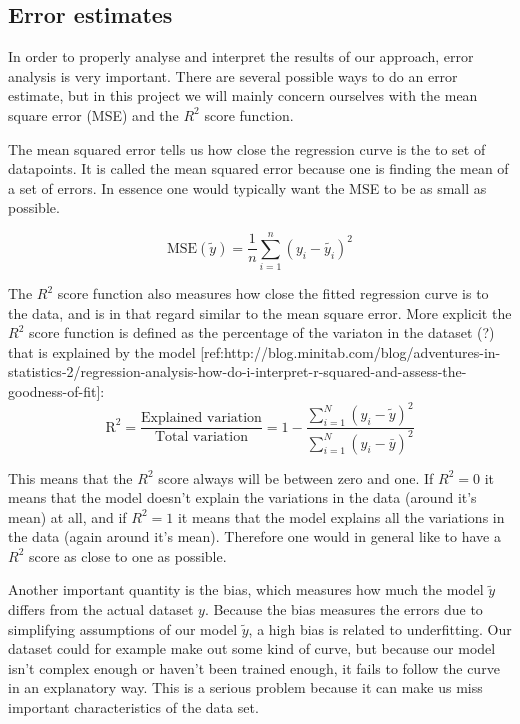 \documentclass[a4paper,12pt]{article}
\begin{document}
\subsection{Error estimates}
In order to properly analyse and interpret the results of our approach, error analysis is very important. There are several possible ways to do an error estimate, but in this project we will mainly concern ourselves with the mean square error (MSE) and the $R^2$ score function.\newline

The mean squared error tells us how close the regression curve is the to set of datapoints. It is called the mean squared error because one is finding the mean of a set of errors. In essence one would typically want the MSE to be as small as possible.

\begin{equation}
\text{MSE}(\tilde{y})=\frac{1}{n}\sum_{i=1}^n(y_i-\tilde{y_i})^2
\end{equation}

The $R^2$ score function also measures how close the fitted regression curve is to the data, and is in that regard similar to the mean square error. More explicit the $R^2$ score function is defined as the percentage of the variaton in the dataset (?) that is explained by the model [ref:http://blog.minitab.com/blog/adventures-in-statistics-2/regression-analysis-how-do-i-interpret-r-squared-and-assess-the-goodness-of-fit]:
\begin{equation}
\text{R}^2=\frac{\text{Explained variation}}{\text{Total variation}} = 1-\frac{\sum_{i=1}^N(y_i-\tilde{y})^2}{\sum_{i=1}^N(y_i-\bar{y})^2}
\end{equation}

This means that the $R^2$ score always will be between zero and one. If $R^2 = 0$ it means that the model doesn't explain the variations in the data (around it's mean) at all, and if $R^2 = 1$ it means that the model explains all the variations in the data (again around it's mean). Therefore one would in general like to have a $R^2$ score as close to one as possible.\newline

Another important quantity is the bias, which measures how much the model $\tilde{y}$ differs from the actual dataset $y$. Because the bias measures the errors due to simplifying assumptions of our model $\tilde{y}$, a high bias is related to underfitting. Our dataset could for example make out some kind of curve, but because our model isn't complex enough or haven't been trained enough, it fails to follow the curve in an explanatory way. This is a serious problem because it can make us miss important characteristics of the data set.
\end{document}
